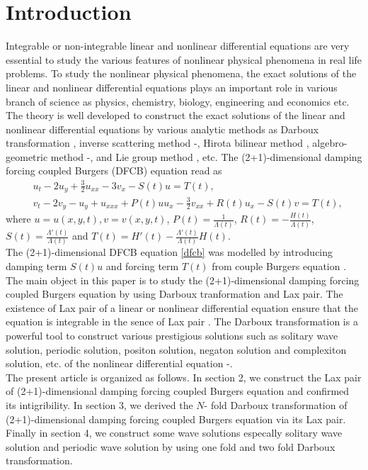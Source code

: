 \documentclass{article}%
\begin{document}
	\section{Introduction}
Integrable or non-integrable linear and nonlinear differential equations are very essential to study the various features of nonlinear physical phenomena in real life problems. To study the nonlinear physical phenomena, the exact solutions of the linear and nonlinear  differential equations plays an important role in various branch of science as physics, chemistry, biology, engineering and economics etc. The theory is well developed to construct the exact solutions of the linear and nonlinear differential equations by various analytic methods as Darboux transformation \cite{darbox_1}, inverse scattering method \cite{inv1}-\cite{AKNS}, Hirota bilinear method \cite{hirota1}, algebro-geometric method \cite{algeb1}-\cite{algeb2}, and Lie group method \cite{sk}, etc. The (2+1)-dimensional damping forcing coupled Burgers (DFCB) equation read as
\begin{equation}
\begin{split}
&u_{t}-2u_{y}+\frac{3}{2}u_{xx}-3v_{x}-S(t)u=T(t),\\
&v_{t}-2v_{y}-u_{y}+u_{xxx}+P(t)uu_x-\frac{3}{2}v_{xx}+R(t)u_x-S(t)v=T(t),\label{dfcb}
\end{split}
\end{equation}
where $u=u(x,y,t), v=v(x,y,t)$, $P(t)=\frac{1}{\Lambda(t)}$, $R(t)=-\frac{H(t)}{\Lambda(t)}$, $S(t)=\frac{\Lambda'(t)}{\Lambda(t)}$ and $T(t)=H'(t)-\frac{\Lambda'(t)}{\Lambda(t)}H(t)$.\\
The (2+1)-dimensional DFCB equation \eqref{dfcb} was modelled by introducing damping term $ S(t)u$ and forcing term $T(t)$ from couple Burgers equation \cite{Tingsu}. The main object in this paper  is to study the (2+1)-dimensional damping forcing coupled Burgers equation by using Darboux tranformation and Lax pair. The existence of Lax pair of a linear or nonlinear differential equation ensure that the equation is integrable in the sence of Lax pair \cite{P.D.Lax}. The Darboux transformation is a powerful tool to construct various prestigious solutions such as solitary wave solution, periodic solution, positon solution, negaton solution and complexiton solution, etc. of the nonlinear differential equation \cite{nk1}-\cite{pc}.\\
The present article is organized as follows. In section 2, we construct the Lax pair of (2+1)-dimensional damping forcing coupled Burgers equation and confirmed its intigribility. In section 3, we derived the $N$- fold Darboux transformation of (2+1)-dimensional damping forcing coupled Burgers equation via its Lax pair. Finally in section 4, we construct some wave solutions especally solitary wave solution and periodic wave solution by using one fold and two fold Darboux transformation.
\end{document}
